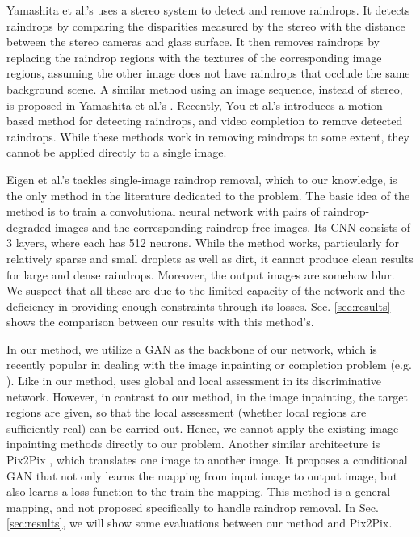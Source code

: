 \documentclass[10pt,twocolumn,letterpaper]{article}
\begin{document}
Yamashita et al.'s \cite{yamashita2005removal} uses a stereo system to detect and remove raindrops. It detects raindrops by comparing  the disparities measured by the stereo with the distance between the stereo cameras and glass surface. It then removes raindrops by replacing the raindrop regions with the  textures of the corresponding image regions, assuming the other image does not have raindrops that occlude the same background scene. A similar method using an image sequence, instead of stereo, is proposed in Yamashita et al.'s \cite{yamashita2009noises}. Recently, You et al.'s \cite{you2016adherent} introduces a motion based method for detecting raindrops, and video completion to remove detected raindrops. While these methods work in removing raindrops  to some extent, they cannot be applied directly to a single image. 

Eigen et al.'s \cite{eigen2013restoring} tackles  single-image raindrop removal, which to our knowledge, is the only method  in the literature dedicated to the problem. The basic idea of the method is to train a convolutional neural network with pairs of raindrop-degraded images and the corresponding raindrop-free images. Its CNN consists of 3 layers, where each has 512 neurons. While the method works, particularly for relatively sparse and small droplets as well as dirt, it cannot produce  clean results for large and dense raindrops.  Moreover, the output images are somehow blur. We suspect that all these are due to the limited capacity of the network and the deficiency in providing enough constraints through its losses. Sec. \ref{sec:results} shows the comparison between our results with this method's.

In our method, we utilize a GAN \cite{goodfellow2014generative} as the backbone of our network, which is recently popular in dealing with the image inpainting or completion problem (e.g. \cite{iizuka2017globally,li2017generative}). Like in our method, \cite{iizuka2017globally} uses global and local assessment in its discriminative network. However, in contrast to our method, in the image inpainting, the target regions are given, so that the local assessment (whether local regions are sufficiently real) can be carried out. Hence, we cannot apply the existing image inpainting methods directly to our problem. Another similar architecture is Pix2Pix \cite{isola2016image}, which translates one image to another image.  It proposes a conditional GAN that not only learns the mapping from input image to output image, but also learns a loss function to the train the mapping. This method is a general mapping, and not proposed specifically to handle raindrop removal. In Sec. \ref{sec:results}, we will show some evaluations between our method and Pix2Pix.
\end{document}
